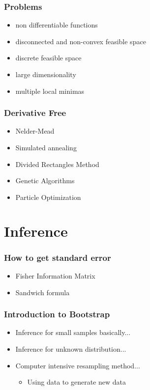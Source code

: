 \documentclass{beamer}
\newcommand{\1}{\mathbb{1}}
\begin{document}
\begin{frame}\frametitle{Problems}
\begin{itemize}
\item non differentiable functions
\item disconnected and non-convex feasible space
\item discrete feasible space
\item large dimensionality
\item multiple local minimas
\end{itemize}
\end{frame}

\begin{frame}\frametitle{Derivative Free}
\begin{itemize}
\item Nelder-Mead
\item Simulated annealing
\item Divided Rectangles Method
\item Genetic Algorithms
\item Particle Optimization
\end{itemize}
\end{frame}


\section{Inference}

\begin{frame}
\tableofcontents[currentsection] 
\end{frame}

\begin{frame}\frametitle{How to get standard error}
\begin{itemize}
\item Fisher Information Matrix
\item Sandwich formula
\end{itemize}
\end{frame}


\begin{frame}\frametitle{Introduction to Bootstrap}
\begin{itemize}
\item Inference for small samples basically...
\item Inference for unknown distribution...
\item Computer intensive resampling method...
\begin{itemize}
\item Using data to generate new data
\end{itemize}
\end{itemize}
\end{frame}
\end{document}
